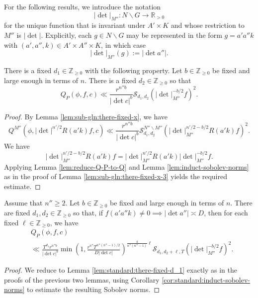 For the following results, we introduce the notation
\begin{equation*}
  |\det|_{M''} : N \backslash G \rightarrow \mathbb{R}_{>0}
\end{equation*}
for the unique function that is invariant under $A' \times K$ and whose restriction to $M''$ is $|\det|$.  Explicitly, each $g \in N \backslash G$ may be represented in the form $g = a' a'' k$ with $(a',a'',k) \in A' \times A'' \times K$, in which case
\begin{equation*}
  |\det|_{M''}(g) := |\det a''|.
\end{equation*}

\begin{lemma}\label{lem:sub-gln:there-fixed-x-1}
  There is a fixed $d_1 \in \mathbb{Z}_{\geq 0}$ with the following property.  Let $b \in \mathbb{Z}_{\geq 0}$ be fixed and large enough in terms of $n$.  There is a fixed $d_2 \in \mathbb{Z}_{\geq 0}$ so that
  \begin{equation*}
    Q_P(\phi,f,c)
    \ll
    \frac{r^{n'' b}}{|\det c|^b}
    \mathcal{S}_{d_1, d_2}\left(|\det|_{M''}^{-b/2} f\right)^2.
  \end{equation*}
\end{lemma}
\begin{proof}
  By Lemma \ref{lem:sub-gln:there-fixed-x}, we have
  \begin{equation*}
    Q^{M''}\left(\phi, |\det|^{n'/2} R(a' k) f, c\right)
    \ll
    \frac{r^{n'' b}}{|\det c|^b}
    \mathcal{S}_{d_1, d_2}^{N'' \backslash M''}\left(|\det|_{M''}^{n'/2 - b/2} R(a' k) f\right)^2.
  \end{equation*}
  We have
  \begin{equation*}
    |\det|_{M''}^{n'/2 - b/2} R(a' k) f
    =
    |\det|_{M''}^{n'/2} R(a' k)
    |\det|_{M''}^{- b/2}
    f.
  \end{equation*}
  Applying Lemma \ref{lem:reduce-Q-P-to-Q} and Lemma \ref{lem:induct-sobolev-norms} as in the proof of Lemma \ref{lem:sub-gln:there-fixed-x-3} yields the required estimate.
\end{proof}

\begin{lemma}\label{lem:sub-gln:there-fixed-x-2}
  Assume that $n'' \geq 2$.  Let $b \in \mathbb{Z}_{\geq 0}$ be fixed and large enough in terms of $n$.  There are fixed $d_1,d_2 \in \mathbb{Z}_{\geq 0}$ so that, if $f(a ' a'' k) \neq 0 \implies |\det a''| \asymp D$, then for each fixed $\ell \in \mathbb{Z}_{\geq 0}$, we have
  \begin{align*}
    &Q_P(\phi,f,c)
    \\
    &\ll \frac{T^{d_1} r^{n'' b}}{|\det c|^b}
      \min \left( 1,
      \frac{r^{n''} T^{n''(n''-1)/2}}{D |\det c|}
      \right)^{\frac{4}{n''(n''-1)} \ell }
      \mathcal{S}_{d_1, d_2 +\ell, T}\left(|\det|_{M''}^{-b/2} f\right)^2.
  \end{align*}
\end{lemma}
\begin{proof}
  We reduce to Lemma \ref{lem:standard:there-fixed-d_1} exactly as in the proofs of the previous two lemmas, using Corollary \ref{cor:standard:induct-sobolev-norms} to estimate the resulting Sobolev norms.
\end{proof}


